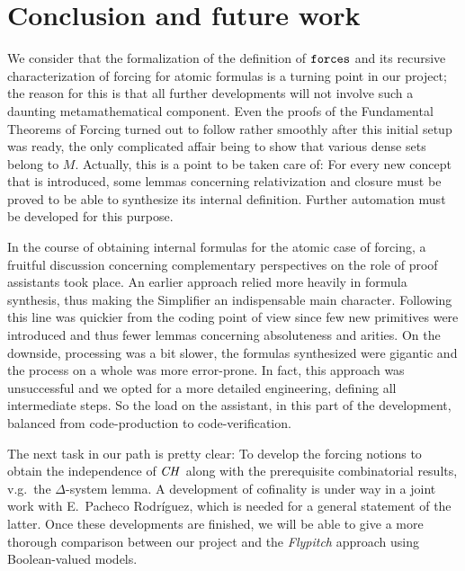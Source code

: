\section{Conclusion and future work}
\label{sec:conclusion}

We consider that the formalization of the definition of $\mathop{\mathtt{forces}}$
and its recursive characterization of forcing for atomic formulas is
a turning point
in our project; the reason for this is that all further
developments will not involve such a daunting metamathematical
component. Even the proofs of the Fundamental Theorems of Forcing
turned out to follow rather smoothly after this initial setup was
ready, the only complicated affair being to show that various dense sets belong
to $M$. 
%
Actually, this is a point to be taken care of: For every new
concept that is introduced, some lemmas concerning 
relativization and closure must be proved to be able to synthesize its
internal definition. Further automation must be developed for this
purpose.

In the course of obtaining internal formulas for the atomic case of
forcing, a fruitful discussion
concerning complementary perspectives on the role of proof assistants
took place. An earlier approach relied more heavily in formula
synthesis, thus making the Simplifier an indispensable main
character. Following this line was quickier from the coding point of
view since few new primitives were introduced and thus fewer lemmas
concerning absoluteness and arities. On the downside, processing was a
bit slower, the formulas synthesized were gigantic and the process on
a whole was more error-prone. In fact, this approach was unsuccessful
and we opted for a more detailed engineering, defining all
intermediate steps. So the load on the assistant, in this part of the
development, balanced from code-production to code-verification. 

The next task in our path is pretty clear: To develop the forcing
notions to obtain the independence of $\mathit{CH}$ 
along with the prerequisite combinatorial results, v.g.\ the
$\Delta$-system lemma. A development of cofinality is under way in a
joint work with E.~Pacheco Rodríguez, which is needed for a general
statement of the latter. Once these developments are finished, we will
be able to give a more thorough comparison between our project and
the \emph{Flypitch} approach using Boolean-valued models.

